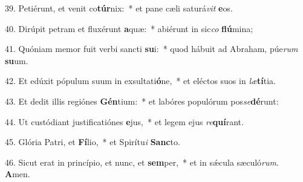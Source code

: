 39. Petiérunt, et venit co\textbf{túr}nix:~*  et pane cæli saturá\textit{vit} \textbf{e}os.\

40. Dirúpit petram et fluxérunt \textbf{a}quæ:~*  abiérunt in sic\textit{co} \textbf{flú}mina;\

41. Quóniam memor fuit verbi sancti \textbf{su}i:~*  quod hábuit ad Abraham, púe\textit{rum} \textbf{su}um.\

42. Et edúxit pópulum suum in exsultati\textbf{ó}ne,~*  et eléctos suos in \textit{læ}\textbf{tí}tia.\

43. Et dedit illis regiónes \textbf{Gén}tium:~*  et labóres populórum pos\textit{se}\textbf{dé}runt:\

44. Ut custódiant justificatiónes \textbf{e}jus,~*  et legem ejus \textit{re}\textbf{quí}rant.\

45. Glória Patri, et \textbf{Fí}lio,~*  et Spirítu\textit{i} \textbf{Sanc}to.\

46. Sicut erat in princípio, et nunc, et \textbf{sem}per,~*  et in sǽcula sæculó\textit{rum}. \textbf{A}men.\

